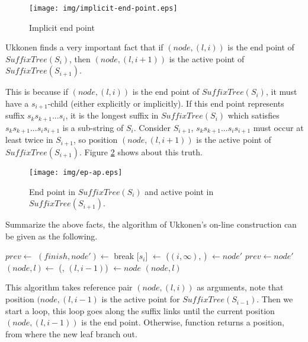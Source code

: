 \documentclass{article}
\begin{document}
\begin{figure}[htbp]
  \centering
  \texttt{[image: img/implicit-end-point.eps]}
  \caption{Implicit end point}
  \label{fig:implicit-end-point}
\end{figure}

Ukkonen finds a very important fact that if $(node, (l, i))$ is the end
point of $SuffixTree(S_i)$, then $(node, (l, i+1))$ is the active point of
$SuffixTree(S_{i+1})$.

This is because if $(node, (l, i))$ is the end point of $SuffixTree(S_i)$,
it must have a $s_{i+1}$-child (either explicitly or implicitly).
If this end point represents suffix $s_ks_{k+1}...s_i$, it is the longest
suffix in $SuffixTree(S_i)$ which satisfies $s_ks_{k+1}...s_is_{i+1}$ is a sub-string
of $S_i$. Consider $S_{i+1}$, $s_ks_{k+1}...s_is_{i+1}$ must occur at least
twice in $S_{i+1}$, so position $(node, (l, i+1))$ is the active point of
$SuffixTree(S_{i+1})$. Figure \ref{fig:ep-ap} shows about this truth.

\begin{figure}[htbp]
  \centering
  \texttt{[image: img/ep-ap.eps]}
  \caption{End point in $SuffixTree(S_i)$ and active point in $SuffixTree(S_{i+1})$.}
  \label{fig:ep-ap}
\end{figure}

Summarize the above facts, the algorithm of Ukkonen's on-line construction can
be given as the following.

\begin{algorithmic}[1]
  \State $prev \gets$   %
  \Loop {}
    \State $(finish, node') \gets$ 
      \State break
    \EndIf
    \State {}[$s_i$] $\gets$ ($(i, \infty)$, )
    \State {} $\gets node'$
    \State $prev \gets node'$
    \State $(node, l) \gets $ (, $(l, i-1)$)
  \EndLoop
  \State {} $\gets node$
  \State \Return $(node, l)$ 
\EndFunction
\end{algorithmic}

This algorithm takes reference pair $(node, (l, i))$ as arguments, note that
position $(node, (l, i-1)$ is the active point for $SuffixTree(S_{i-1})$.
Then we start a loop, this loop goes along the suffix links until
the current position $(node, (l, i-1))$ is the end point. Otherwise,
function  returns a position, from
where the new leaf branch out.
\end{document}
